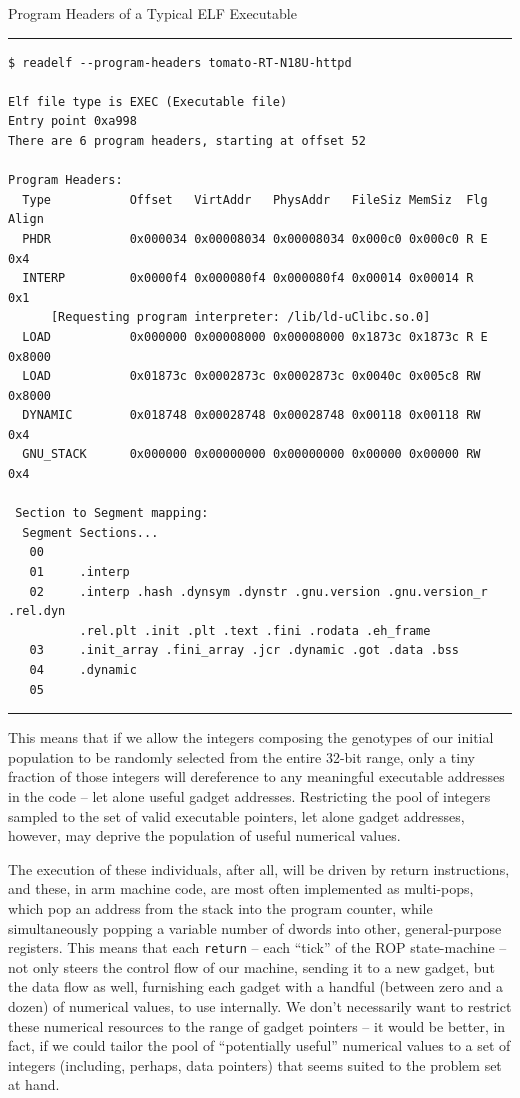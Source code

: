 \documentclass[12pt,glossary]{dalthesis}
\begin{document}
\begin{table}
\scriptsize
\caption{Program Headers of a Typical ELF Executable}
\label{tab:readelf-tomato}
\hrule
\begin{verbatim}
$ readelf --program-headers tomato-RT-N18U-httpd

Elf file type is EXEC (Executable file)
Entry point 0xa998
There are 6 program headers, starting at offset 52

Program Headers:
  Type           Offset   VirtAddr   PhysAddr   FileSiz MemSiz  Flg Align
  PHDR           0x000034 0x00008034 0x00008034 0x000c0 0x000c0 R E 0x4
  INTERP         0x0000f4 0x000080f4 0x000080f4 0x00014 0x00014 R   0x1
      [Requesting program interpreter: /lib/ld-uClibc.so.0]
  LOAD           0x000000 0x00008000 0x00008000 0x1873c 0x1873c R E 0x8000
  LOAD           0x01873c 0x0002873c 0x0002873c 0x0040c 0x005c8 RW  0x8000
  DYNAMIC        0x018748 0x00028748 0x00028748 0x00118 0x00118 RW  0x4
  GNU_STACK      0x000000 0x00000000 0x00000000 0x00000 0x00000 RW  0x4

 Section to Segment mapping:
  Segment Sections...
   00     
   01     .interp 
   02     .interp .hash .dynsym .dynstr .gnu.version .gnu.version_r .rel.dyn 
          .rel.plt .init .plt .text .fini .rodata .eh_frame 
   03     .init_array .fini_array .jcr .dynamic .got .data .bss 
   04     .dynamic 
   05     
\end{verbatim}
\hrule
\end{table}

This means that if we allow the integers composing the genotypes of our
initial population to be randomly selected from the entire 32-bit range,
only a tiny fraction of those integers will dereference to any meaningful
executable addresses in the code -- let alone useful gadget addresses.
Restricting the pool of integers sampled to the set of valid executable 
pointers, let alone gadget addresses, however, may deprive
the population of useful numerical values. 

The execution of these individuals, after all, will be driven by return
instructions, and these, in \gls{arm} machine code, are most often implemented as
multi-pops, which pop an address from the stack into the program counter, while
simultaneously popping a variable number of dwords into other, general-purpose
registers. This means that each \texttt{return} -- each ``tick'' of the ROP state-machine
-- not only steers the control flow of our machine, sending it to a new gadget,
but the data flow as well, furnishing each gadget with a handful (between zero
and a dozen) of numerical values, to use internally. We don't necessarily want
to restrict these numerical resources to the range of gadget pointers -- it would
be better, in fact, if we could tailor the pool of ``potentially useful'' numerical
values to a set of integers (including, perhaps, data pointers) that seems suited
to the problem set at hand. 
\end{document}
